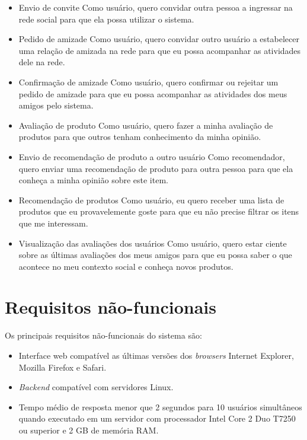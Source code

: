\begin{itemize}
  
  \item Envio de convite
  \subitem Como usuário, quero convidar outra pessoa a ingressar na rede social para que ela possa utilizar o sistema.
  
  \item Pedido de amizade
  \subitem Como usuário, quero convidar outro usuário a estabelecer uma relação de amizada na rede para que eu possa acompanhar as atividades dele na rede.
  
  \item Confirmação de amizade
  \subitem Como usuário, quero confirmar ou rejeitar um pedido de amizade para que eu possa acompanhar as atividades dos meus amigos pelo sistema.
	
	\item Avaliação de produto
  \subitem Como usuário, quero fazer a minha avaliação de produtos para que outros tenham conhecimento da minha opinião.
  
	\item Envio de recomendação de produto a outro usuário
  \subitem Como recomendador, quero enviar uma recomendação de produto para outra pessoa para que ela conheça a minha opinião sobre este item.
  
	\item Recomendação de produtos
	\subitem Como usuário, eu quero receber uma lista de produtos que eu provavelemente goste para que eu não precise filtrar os itens que me interessam.

    \item Visualização das avaliações dos usuários
    \subitem Como usuário, quero estar ciente sobre as últimas avaliações dos meus amigos para que eu possa saber o que acontece no meu contexto social e conheça novos produtos.
	
\end{itemize}

\section{Requisitos não-funcionais}

Os principais requisitos não-funcionais do sistema são:

\begin{itemize}

    \item Interface web compatível as últimas versões dos \textit{browsers} Internet Explorer, Mozilla Firefox e Safari.
    
    \item \textit{Backend} compatível com servidores Linux.

    \item Tempo médio de resposta menor que 2 segundos para 10 usuários simultâneos quando executado em um servidor com processador Intel Core 2 Duo T7250 ou superior e 2 GB de memória RAM. %

\end{itemize}

